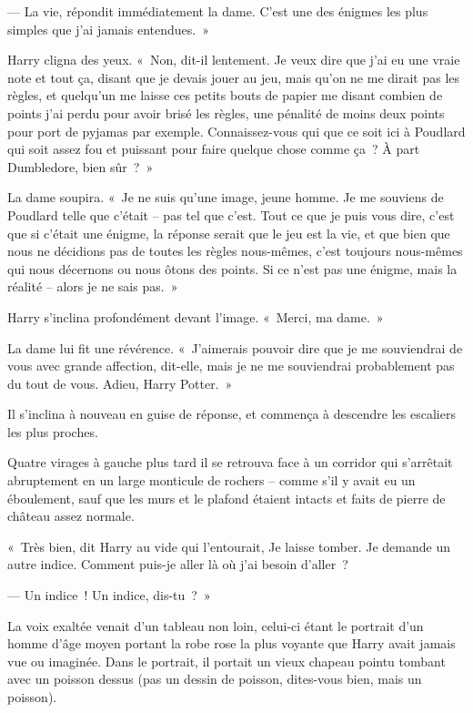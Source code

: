 --- La vie, répondit immédiatement la dame. C'est une des énigmes les plus simples que j'ai jamais entendues.~»

Harry cligna des yeux. «~Non, dit-il lentement. Je veux dire que j'ai eu une vraie note et tout ça, disant que je devais jouer au jeu, mais qu'on ne me dirait pas les règles, et quelqu'un me laisse ces petits bouts de papier me disant combien de points j'ai perdu pour avoir brisé les règles, une pénalité de moins deux points pour port de pyjamas par exemple. Connaissez-vous qui que ce soit ici à Poudlard qui soit assez fou et puissant pour faire quelque chose comme ça~? À part Dumbledore, bien sûr~?~»

La dame soupira. «~Je ne suis qu'une image, jeune homme. Je me souviens de Poudlard telle que c'était -- pas tel que c'est. Tout ce que je puis vous dire, c'est que si c'était une énigme, la réponse serait que le jeu est la vie, et que bien que nous ne décidions pas de toutes les règles nous-mêmes, c'est toujours nous-mêmes qui nous décernons ou nous ôtons des points. Si ce n'est pas une énigme, mais la réalité -- alors je ne sais pas.~»

Harry s'inclina profondément devant l'image. «~Merci, ma dame.~»

La dame lui fit une révérence. «~J'aimerais pouvoir dire que je me souviendrai de vous avec grande affection, dit-elle, mais je ne me souviendrai probablement pas du tout de vous. Adieu, Harry Potter.~»

Il s'inclina à nouveau en guise de réponse, et commença à descendre les escaliers les plus proches.

Quatre virages à gauche plus tard il se retrouva face à un corridor qui s'arrêtait abruptement en un large monticule de rochers -- comme s'il y avait eu un éboulement, sauf que les murs et le plafond étaient intacts et faits de pierre de château assez normale.

«~Très bien, dit Harry au vide qui l'entourait, Je laisse tomber. Je demande un autre indice. Comment puis-je aller là où j'ai besoin d'aller~?

--- Un indice~! Un indice, dis-tu~?~»

La voix exaltée venait d'un tableau non loin, celui-ci étant le portrait d'un homme d'âge moyen portant la robe rose la plus voyante que Harry avait jamais vue ou imaginée. Dans le portrait, il portait un vieux chapeau pointu tombant avec un poisson dessus (pas un dessin de poisson, dites-vous bien, mais un poisson).

